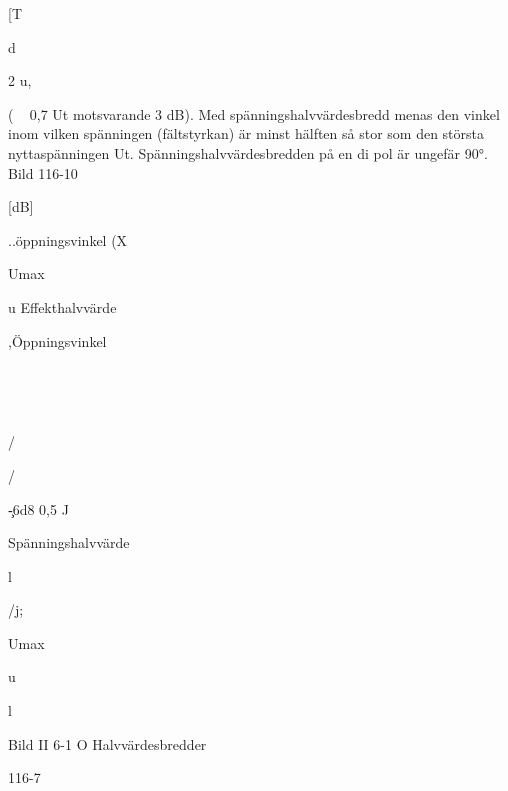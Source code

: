 [T

d

2 u,

( ~ 0,7 Ut motsvarande 3 dB).
Med spänningshalvvärdesbredd menas
den vinkel inom vilken spänningen (fältstyrkan) är minst hälften så stor som den
största nyttaspänningen Ut. Spänningshalvvärdesbredden på en di pol är ungefär 90°.
Bild 116-10

[dB]

..öppningsvinkel (X

Umax

u
Effekthalvvärde

,Öppningsvinkel

\

\

/

/

\c-6d8
0,5
J

Spänningshalvvärde

l

/j;

Umax

u

l

Bild II 6-1 O Halvvärdesbredder

116-7

